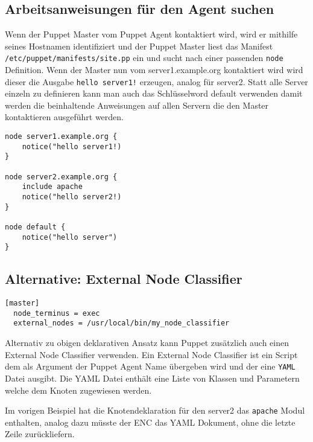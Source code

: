 \documentclass[12pt,a4paper,ngerman]{article}
\begin{document}

\subsection{Arbeitsanweisungen für den Agent suchen}

Wenn der Puppet Master vom Puppet Agent kontaktiert wird, wird er mithilfe seines Hostnamen identifiziert und der Puppet Master liest das Manifest \lstinline$/etc/puppet/manifests/site.pp$ ein und sucht nach einer passenden \lstinline$node$ Definition. Wenn der Master nun vom server1.example.org kontaktiert wird wird dieser die Ausgabe \lstinline$hello server1!$ erzeugen, analog für server2. Statt alle Server einzeln zu definieren kann man auch das Schlüsselword default verwenden damit werden die beinhaltende Anweisungen auf allen Servern die den Master kontaktieren ausgeführt werden. 


\begin{lstlisting}[language=puppet,caption=Node Definitionen in /etc/puppet/manifests/site.pp, label=puppet-node-classifier]
node server1.example.org {
    notice("hello server1!)
}

node server2.example.org {
    include apache
    notice("hello server2!)
}

node default {
    notice("hello server")
}

\end{lstlisting}  

\subsection{Alternative: External Node Classifier}
     
\begin{lstlisting}[caption=External Node Classifier Konfiguration des Puppet Master, label=puppet-enc-config]
[master]
  node_terminus = exec
  external_nodes = /usr/local/bin/my_node_classifier
\end{lstlisting} 

Alternativ zu obigen deklarativen Ansatz kann Puppet zusätzlich auch einen External Node Classifier verwenden.  Ein External Node Classifier ist ein Script dem als Argument der Puppet Agent Name übergeben wird und der eine \lstinline$YAML$ Datei ausgibt. Die YAML Datei enthält eine Liste von Klassen und Parametern welche dem Knoten zugewiesen werden.  

Im vorigen Beispiel hat die Knotendeklaration für den server2 das \lstinline$apache$ Modul enthalten, analog dazu müsste der ENC das YAML Dokument, ohne die letzte Zeile zurückliefern.  
\end{document}
